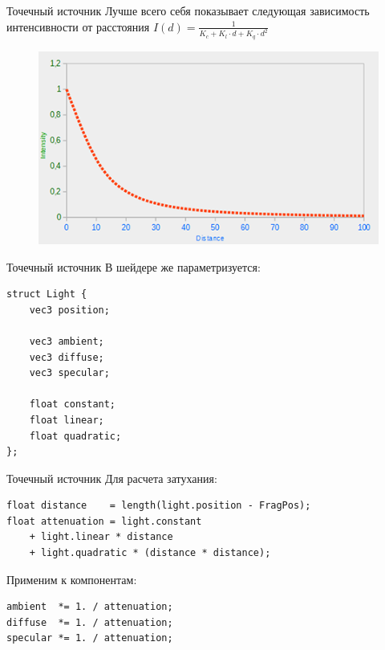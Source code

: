 \documentclass[aspectration=1610,t]{beamer}
\begin{document}
\begin{frame}[fragile]{Точечный источник}
    Лучше всего себя показывает следующая зависимость интенсивности от расстояния $I(d) = \frac{1}{K_c + K_l \cdot d + K_q \cdot d^2}$
    \begin{figure}[htp]
        \centering
        \includegraphics[scale=0.4]{res/attenuation.png}
    \end{figure}
\end{frame}

\begin{frame}[fragile]{Точечный источник}
    В шейдере же параметризуется:
    {\small \begin{lstlisting}
struct Light {
    vec3 position;  

    vec3 ambient;
    vec3 diffuse;
    vec3 specular;

    float constant;
    float linear;
    float quadratic;
}; 
    \end{lstlisting}}
\end{frame}

\begin{frame}[fragile]{Точечный источник}
    Для расчета затухания:
    {\small \begin{lstlisting}
float distance    = length(light.position - FragPos);
float attenuation = light.constant
    + light.linear * distance
    + light.quadratic * (distance * distance); 
    \end{lstlisting}}
    Применим к компонентам:
    {\small \begin{lstlisting}
ambient  *= 1. / attenuation; 
diffuse  *= 1. / attenuation;
specular *= 1. / attenuation;
    \end{lstlisting}}
\end{frame}
\end{document}
